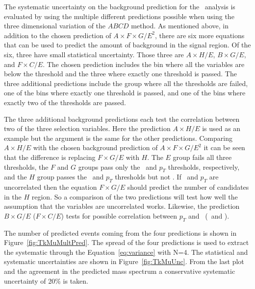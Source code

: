 The systematic uncertainty on the background prediction for the \tktof\ analysis is evaluated by using the multiple different predictions possible when using the
three dimensional variation of the $ABCD$ method. As mentioned above, in addition to the chosen prediction of $A\times F\times G/E^2$, 
there are six more equations that can be used to predict
the amount of background in the signal region. Of the six, three have small statistical uncertainty. Those three are $A \times H/E$, $B \times G/E$, and $F \times C/E$.
The chosen prediction includes the bin where all the variables are below the threshold and the three where exactly one threshold is passed. The three additional predictions
include the group where all the thresholds are failed, one of the bins where exactly one threshold is passed, and one of the bins where exactly two of the
thresholds are passed.

The three additional background predictions each test the correlation between two of the three selection variables. Here the prediction $A \times H/E$ is used as an example but
the argument is the same for the other predictions. Comparing $A \times H/E$ with the chosen background prediction of $A\times F\times G/E^2$ it can be seen that
the difference is replacing $F\times G/E$ with $H$. The $E$ group fails all three thresholds, the $F$ and $G$ groups pass only the \invbeta\ and $p_T$ thresholds,
respectively, and the $H$ group passes the \invbeta\ and $p_T$ thresholds but not \dedx. If \invbeta\ and $p_T$ are uncorrelated then the equation $F\times G/E$ should
predict the number of candidates in the $H$ region. So a comparison of the two predictions will test how well the assumption that the variables are uncorrelated works.
Likewise, the prediction $B \times G/E$ ($F \times C/E$) tests for possible correlation between $p_T$ and \dedx\ (\invbeta\ and \dedx).

The number of predicted events coming from the four predictions is shown in Figure~\ref{fig:TkMuMultPred}. The spread of the four predictions is used to extract 
the systematic through the Equation~\ref{eq:variance} with N=4. The statistical and systematic uncertainties are shown in Figure~\ref{fig:TkMuUnc}. From the last plot
and the agreement in the predicted mass spectrum a conservative systematic uncertainty of 20\% is taken.

